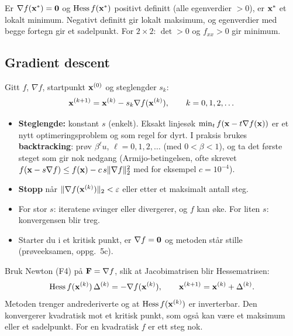 \begin{teorem}
Er $\nabla f(\mathbf{x}^*)=\mathbf{0}$ og $\operatorname{Hess} f(\mathbf{x}^*)$ positivt definitt (alle egenverdier $>0$), er $\mathbf{x}^*$ et lokalt minimum. Negativt definitt gir lokalt maksimum, og egenverdier med begge fortegn gir et sadelpunkt. For $2\times2$: $\det>0$ og $f_{xx}>0$ gir minimum.
\end{teorem}

\subsection{Gradient descent}
\begin{oppskrift}
Gitt $f$, $\nabla f$, startpunkt $\mathbf{x}^{(0)}$ og steglengder $s_k$:
\[
\mathbf{x}^{(k+1)}=\mathbf{x}^{(k)}-s_k\nabla f(\mathbf{x}^{(k)}),\qquad k=0,1,2,\dots
\]
\begin{itemize}
  \item \textbf{Steglengde:} konstant $s$ (enkelt). Eksakt linjesøk $\min_t f(\mathbf{x}-t\nabla f(\mathbf{x}))$ er et nytt optimeringsproblem og som regel for dyrt. I praksis brukes \textbf{backtracking}: prøv $\beta^\ell u$, $\ell=0,1,2,\dots$ (med $0<\beta<1$), og ta det første steget som gir nok nedgang (Armijo-betingelsen, ofte skrevet $f(\mathbf{x}-s\nabla f)\le f(\mathbf{x})-c\,s\lVert \nabla f\rVert_2^2$ med for eksempel $c=10^{-4}$).
  \item \textbf{Stopp} når $\lVert \nabla f(\mathbf{x}^{(k)})\rVert_2<\varepsilon$ eller etter et maksimalt antall steg.
  \item For stor $s$: iteratene svinger eller divergerer, og $f$ kan øke. For liten $s$: konvergensen blir treg.
  \item Starter du i et kritisk punkt, er $\nabla f=\mathbf{0}$ og metoden står stille (prøveeksamen, oppg.~5c).
\end{itemize}
\end{oppskrift}

\begin{oppskrift}
Bruk Newton (F4) på $\mathbf{F}=\nabla f$, slik at Jacobimatrisen blir Hessematrisen:
\[
\operatorname{Hess} f(\mathbf{x}^{(k)})\,\Delta^{(k)}=-\nabla f(\mathbf{x}^{(k)}),\qquad \mathbf{x}^{(k+1)}=\mathbf{x}^{(k)}+\Delta^{(k)}.
\]
Metoden trenger andrederiverte og at $\operatorname{Hess} f(\mathbf{x}^{(k)})$ er inverterbar. Den konvergerer kvadratisk mot et kritisk punkt, som også kan være et maksimum eller et sadelpunkt. For en kvadratisk $f$ er ett steg nok.
\end{oppskrift}

